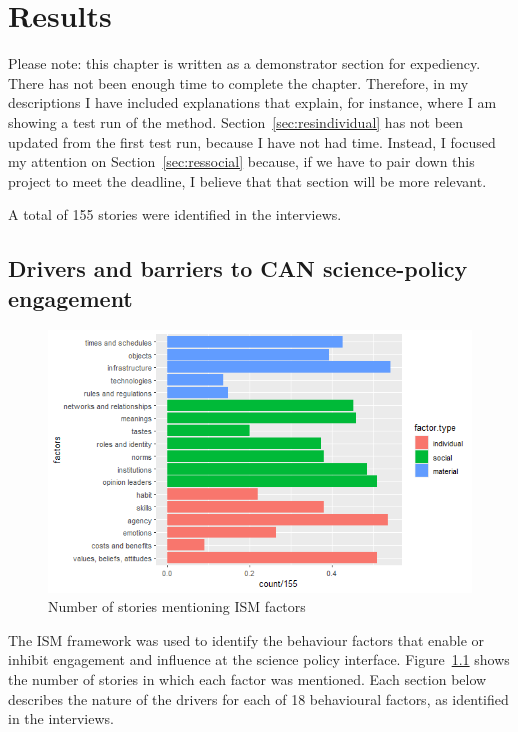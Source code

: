 \chapter{Results}\label{ch:results}

Please note: this chapter is written as a demonstrator section for expediency. There has not been enough time to complete the chapter. Therefore, in my descriptions I have included explanations that explain, for instance, where I am showing a test run of the method. Section~\ref{sec:resindividual} has not been updated from the first test run, because I have not had time. Instead, I focused my attention on Section~\ref{sec:ressocial} because, if we have to pair down this project to meet the deadline, I believe that that section will be more relevant.

A total of 155 stories were identified in the interviews.

\section{Drivers and barriers to CAN science-policy engagement}\label{sec:resultsISM}

\begin{figure}[!ht]
    \centering
    \includegraphics[width=1\linewidth]{figures/ism_count_per_story.png}
    \caption{Number of stories mentioning ISM factors}
    \label{fig:ismstorycount}
\end{figure}

The ISM framework was used to identify the behaviour factors that enable or inhibit engagement and influence at the science policy interface. Figure~\ref{fig:ismstorycount} shows the number of stories in which each factor was mentioned. Each section below describes the nature of the drivers for each of 18 behavioural factors, as identified in the interviews.


